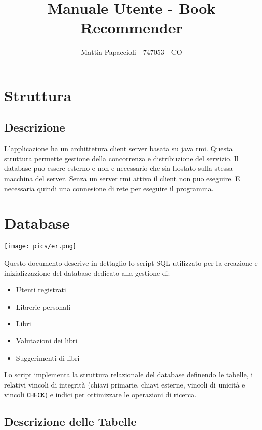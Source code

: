 \documentclass{report}
\title{Manuale Utente - Book Recommender}
\author{Mattia Papaccioli - 747053 - CO}
\begin{document}
\maketitle

\tableofcontents


\chapter{Struttura}
\section{Descrizione}
L'applicazione ha un archittetura client server basata su java rmi. Questa struttura permette gestione della concorrenza e distribuzione del servizio. Il database puo essere esterno e non e necessario che sia hostato sulla stessa macchina del server. Senza un server rmi attivo il client non puo eseguire. E necessaria quindi una connesione di rete per eseguire il programma.

\chapter{Database}
\begin{center}
\texttt{[image: pics/er.png]} 
\end{center}

Questo documento descrive in dettaglio lo script SQL utilizzato per la creazione e inizializzazione del database dedicato alla gestione di:
\begin{itemize}
    \item Utenti registrati
    \item Librerie personali
    \item Libri
    \item Valutazioni dei libri
    \item Suggerimenti di libri
\end{itemize}

Lo script implementa la struttura relazionale del database definendo le tabelle, i relativi vincoli di integrità (chiavi primarie, chiavi esterne, vincoli di unicità e vincoli \texttt{CHECK}) e indici per ottimizzare le operazioni di ricerca.

\section{Descrizione delle Tabelle}
\end{document}
